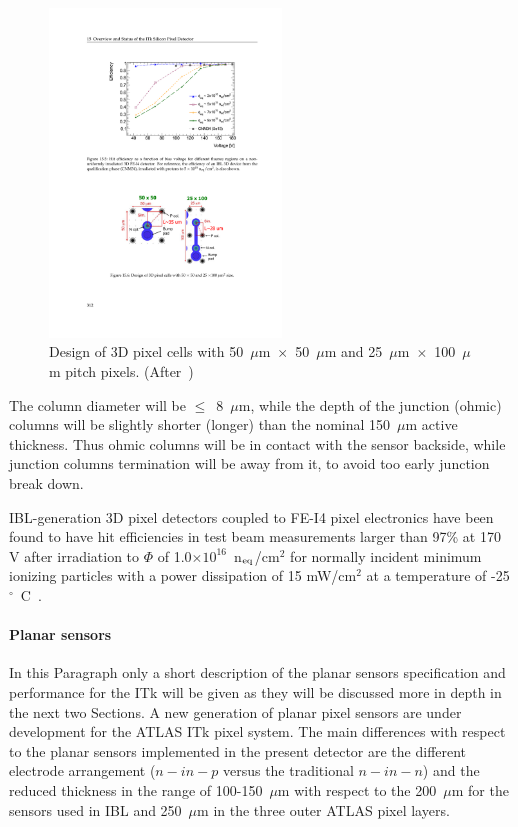 \begin{figure}[!htpb]
\centering
\includegraphics[width=0.55\textwidth]{3D_design.pdf}
\caption{\label{fig:3D_design} Design of 3D pixel cells with 50~$\mu$m~$\times$~50~$\mu$m  and 25~$\mu$m~$\times$~100~$\mu$m pitch pixels. (After~\cite{ITkStripsTDR})}
\end{figure}

The column diameter will be $\le$~8~$\mu$m, while the depth of the junction (ohmic) columns will be 
slightly shorter (longer) than the nominal  150~$\mu$m active thickness. Thus ohmic columns will 
be in contact with the sensor backside, while junction columns termination will be away from it, to 
avoid too early junction break down.

IBL-generation 3D pixel detectors coupled to FE-I4 pixel electronics have been found to have hit efficiencies 
in test beam measurements larger than 97\% at 170 V after irradiation to $\Phi$ of 
1.0$\times10^{16}$~n$_{\rm eq}$/cm$^2$ for normally incident minimum ionizing particles with a power 
dissipation of 15 mW/cm$^2$ at a temperature of -25$^{\circ}$~C~\cite{1748-0221-11-11-C11024}.

\paragraph{Planar sensors}
In this Paragraph only a short description of the planar sensors specification and performance 
for the ITk will be given as they will be discussed more in depth in the next two Sections. 
A new generation of planar pixel sensors are under development for the ATLAS ITk pixel system. The main 
differences with respect to the planar sensors implemented in the present detector are the different 
electrode arrangement ($n-in-p$ versus the traditional $n-in-n$) and the reduced thickness in the range of 
100-150~$\mu$m with respect to the 200~$\mu$m for the sensors used in IBL and 250~$\mu$m 
in the three outer ATLAS pixel layers. 


